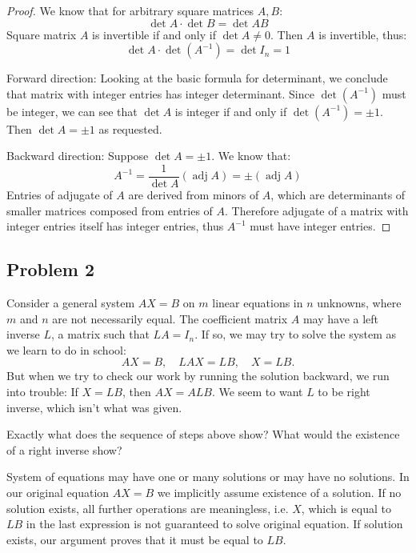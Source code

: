 \documentclass{article}
\DeclareMathOperator{\adj}{\operatorname{adj}}
\begin{document}
\begin{proof}

We know that for arbitrary square matrices $A,B$:
\[ \det A \cdot \det B = \det AB \]
Square matrix $A$ is invertible if and only if $\det A \neq 0$.
Then $A$ is invertible, thus:
\[ \det A \cdot \det (A^{-1}) = \det I_n = 1 \]

Forward direction:
Looking at the basic formula for determinant, we conclude that matrix with integer entries has integer determinant.
Since $\det (A^{-1})$ must be integer, we can see that $\det A$ is integer if and only if $\det (A^{-1}) = \pm 1$.
Then $\det A = \pm 1$ as requested.

Backward direction:
Suppose $\det A = \pm 1$. We know that:
\[ A^{-1} = \frac{1}{\det A} (\adj A) = \pm (\adj A) \]
Entries of adjugate of $A$ are derived from minors of $A$, which are determinants of smaller matrices composed from entries of $A$.
Therefore adjugate of a matrix with integer entries itself has integer entries, thus $A^{-1}$ must have integer entries.

\end{proof}


\subsection*{Problem 2}

\begin{tcolorbox}
Consider a general system $AX = B$ on $m$ linear equations in $n$ unknowns, where $m$ and $n$ are not necessarily equal.
The coefficient matrix $A$ may have a left inverse $L$, a matrix such that $LA=I_n$.
If so, we may try to solve the system as we learn to do in school:
\[ AX=B, \quad LAX=LB, \quad X=LB. \]
But when we try to check our work by running the solution backward, we run into trouble:
If $X=LB$, then $AX=ALB$.
We seem to want $L$ to be right inverse, which isn't what was given.

Exactly what does the sequence of steps above show?
What would the existence of a right inverse show?
\end{tcolorbox}

System of equations may have one or many solutions or may have no solutions.
In our original equation $AX=B$ we implicitly assume existence of a solution.
If no solution exists, all further operations are meaningless, i.e. $X$, which is equal to $LB$ in the last expression is not guaranteed to solve original equation.
If solution exists, our argument proves that it must be equal to $LB$.
\end{document}

